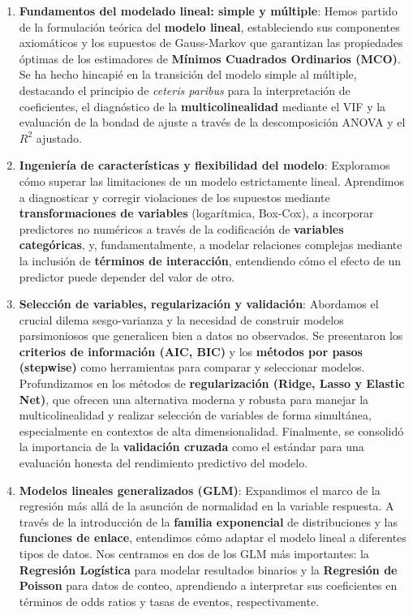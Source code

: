 \documentclass[
  letterpaper,
  DIV=11,
  numbers=noendperiod]{scrreprt}
\begin{document}
\begin{enumerate}
\def\labelenumi{\arabic{enumi}.}
\item
  \textbf{Fundamentos del modelado lineal: simple y múltiple}: Hemos
  partido de la formulación teórica del \textbf{modelo lineal},
  estableciendo sus componentes axiomáticos y los supuestos de
  Gauss-Markov que garantizan las propiedades óptimas de los estimadores
  de \textbf{Mínimos Cuadrados Ordinarios (MCO)}. Se ha hecho hincapié
  en la transición del modelo simple al múltiple, destacando el
  principio de \emph{ceteris paribus} para la interpretación de
  coeficientes, el diagnóstico de la \textbf{multicolinealidad} mediante
  el VIF y la evaluación de la bondad de ajuste a través de la
  descomposición ANOVA y el \(R^2\) ajustado.
\item
  \textbf{Ingeniería de características y flexibilidad del modelo}:
  Exploramos cómo superar las limitaciones de un modelo estrictamente
  lineal. Aprendimos a diagnosticar y corregir violaciones de los
  supuestos mediante \textbf{transformaciones de variables}
  (logarítmica, Box-Cox), a incorporar predictores no numéricos a través
  de la codificación de \textbf{variables categóricas}, y,
  fundamentalmente, a modelar relaciones complejas mediante la inclusión
  de \textbf{términos de interacción}, entendiendo cómo el efecto de un
  predictor puede depender del valor de otro.
\item
  \textbf{Selección de variables, regularización y validación}:
  Abordamos el crucial dilema sesgo-varianza y la necesidad de construir
  modelos parsimoniosos que generalicen bien a datos no observados. Se
  presentaron los \textbf{criterios de información (AIC, BIC)} y los
  \textbf{métodos por pasos (stepwise)} como herramientas para comparar
  y seleccionar modelos. Profundizamos en los métodos de
  \textbf{regularización (Ridge, Lasso y Elastic Net)}, que ofrecen una
  alternativa moderna y robusta para manejar la multicolinealidad y
  realizar selección de variables de forma simultánea, especialmente en
  contextos de alta dimensionalidad. Finalmente, se consolidó la
  importancia de la \textbf{validación cruzada} como el estándar para
  una evaluación honesta del rendimiento predictivo del modelo.
\item
  \textbf{Modelos lineales generalizados (GLM)}: Expandimos el marco de
  la regresión más allá de la asunción de normalidad en la variable
  respuesta. A través de la introducción de la \textbf{familia
  exponencial} de distribuciones y las \textbf{funciones de enlace},
  entendimos cómo adaptar el modelo lineal a diferentes tipos de datos.
  Nos centramos en dos de los GLM más importantes: la \textbf{Regresión
  Logística} para modelar resultados binarios y la \textbf{Regresión de
  Poisson} para datos de conteo, aprendiendo a interpretar sus
  coeficientes en términos de odds ratios y tasas de eventos,
  respectivamente.
\end{enumerate}
\end{document}
